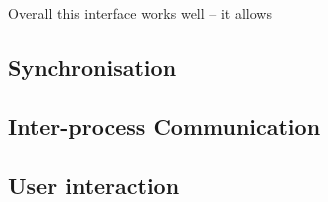         Overall this interface works well -- it allows

\subsection{Synchronisation}
\subsection{Inter-process Communication}
\subsection{User interaction}
